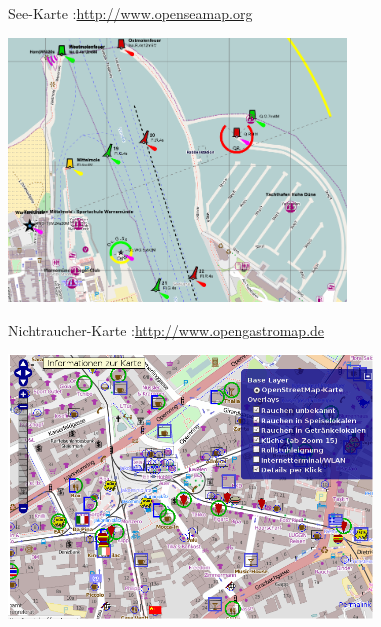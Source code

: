 \documentclass{beamer}
\begin{document}
\begin{frame}{See-Karte :\hfill\url{http://www.openseamap.org}}
\begin{center}
\includegraphics[height=7cm]{style-seamap.png}
\end{center}
\end{frame}

\begin{frame}{Nichtraucher-Karte :\hfill\url{http://www.opengastromap.de}}
\begin{center}
\includegraphics[height=7cm]{smoking.png}
\end{center}
\end{frame}

\hypersetup{urlcolor=blue}
\end{document}
